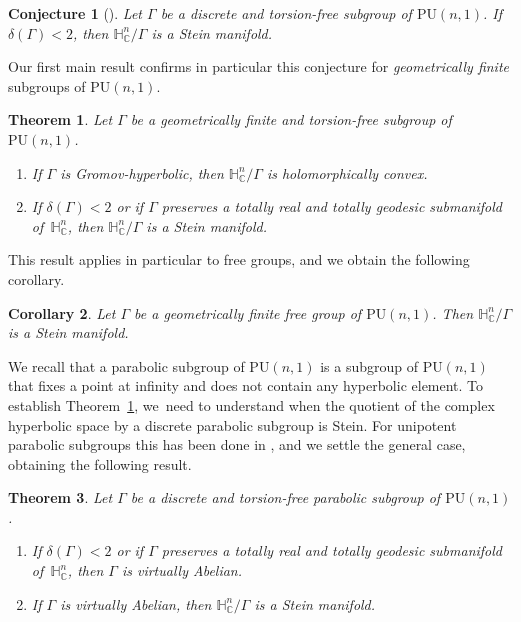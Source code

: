 \documentclass[11pt]{article}
\newenvironment{enumeratea}
{\bgroup\def\theenumi{\alph{enumi}}
\begin{enumerate}}
{\end{enumerate}\egroup}
\newtheorem{theoremIntro}{Theorem}
\newtheorem{corollaryIntro}[theoremIntro]{Corollary}
\newtheorem*{conjecture*}{Conjecture}
\theoremstyle{definition}
\newcommand{\C}{\mathbb{C}}
\newcommand{\HNC}{\mathbb{H}^{n}_{\C}}
\newcommand{\PU}{\mathrm{PU}}
\def\C{\mathbb{C}}
\newcommand{\HNC}{\mathbb{H}^{n}_{\C}}
\newcommand{\PU}{\mathrm{PU}}
\begin{document}
\begin{conjecture*}[{\cite{deyNoteComplexhyperbolicKleinian2020}}]
Let $\Gamma$ be a discrete and torsion-free subgroup of $\PU(n,1)$. If $\delta(\Gamma)<2$, then $\HNC/\Gamma$ is a Stein manifold.
\end{conjecture*}

Our first main result confirms in particular this conjecture for \textit{geometrically finite }subgroups of $\PU(n,1)$.

\begin{theoremIntro}\label{thm-geom-fini-delta-stein}
Let $\Gamma$ be a geometrically finite and torsion-free subgroup of $\PU(n,1)$.
\begin{enumeratea}
\item\label{thm-geom-fini-delta-steina} If $\Gamma$ is Gromov-hyperbolic, then $\HNC/\Gamma$ is holomorphically convex.
\item\label{thm-geom-fini-delta-steinb} If $\delta(\Gamma)<2$ or if $\Gamma$ preserves a totally real and totally geodesic submanifold of~$\HNC$, then $\HNC/\Gamma$ is a Stein manifold.
\end{enumeratea}
\end{theoremIntro}

This result applies in particular to free groups, and we obtain the following corollary.
\begin{corollaryIntro}\label{cor-free}
Let $\Gamma$ be a geometrically finite free group of $\PU(n,1)$. Then $\HNC/\Gamma$ is a Stein manifold.
\end{corollaryIntro}

We recall that a parabolic subgroup of $\PU(n,1)$ is a subgroup of $\PU(n,1)$ that fixes a point at infinity and does not contain any hyperbolic element. To establish Theorem~\ref{thm-geom-fini-delta-stein}, we~need to understand when the quotient
of the complex hyperbolic space by a discrete parabolic subgroup is Stein. For unipotent parabolic subgroups this has been done in \cite{miebachQuotientsBoundedHomogeneous2024}, and we settle the general case, obtaining the following result.
\begin{theoremIntro}\label{thm-parabolique-abelien-delta-stein}
Let $\Gamma$ be a discrete and torsion-free parabolic subgroup of $\PU(n,1)$.
\begin{enumeratea}
\item\label{thm-parabolique-abelien-delta-steina} If $\delta(\Gamma)<2$ or if $\Gamma$ preserves a totally real and totally geodesic submanifold of~$\HNC$, then $\Gamma$ is virtually Abelian.
\item\label{thm-parabolique-abelien-delta-steinb} If $\Gamma$ is virtually Abelian, then $\HNC/\Gamma$ is a Stein manifold.
\end{enumeratea}
\end{theoremIntro}
\end{document}
